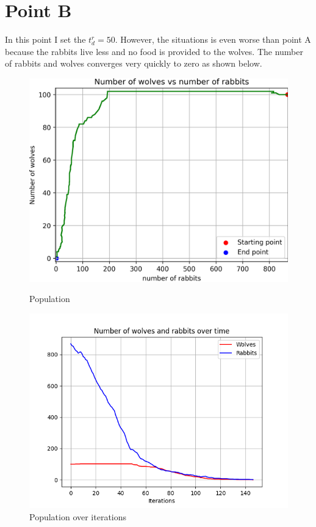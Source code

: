 \documentclass[unicode,11pt,a4paper,oneside,numbers=endperiod,openany]{scrartcl}
\begin{document}
\section*{Point B}
In this point I set the $t_d^r=50$. However, the situations is even worse than point A because the rabbits live less and no food is provided to the wolves. The number of rabbits and wolves converges very quickly to zero as shown below. 
\begin{figure}[H]
  \centering
  \begin{minipage}[b]{0.435\textwidth}
    \centering
    \includegraphics[width=\textwidth]{output_main/PointBnew_populations.png}
    \caption{Population}
  \end{minipage}
  \hfill
  \begin{minipage}[b]{0.49\textwidth}
    \centering
    \includegraphics[width=\textwidth]{output_main/PointBnew.png}
    \caption{Population over iterations}
  \end{minipage}
\end{figure}
\end{document}
